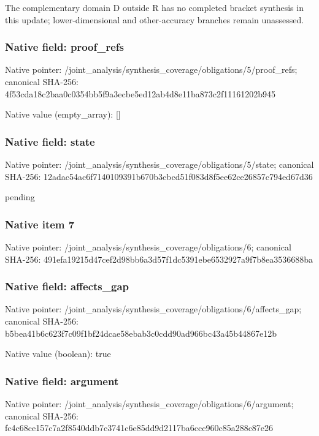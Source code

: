 \documentclass[10pt,a4paper]{article}
\begin{document}
\begingroup\raggedright\sloppy The complementary domain D outside R has no completed bracket synthesis in this update;\allowbreak{} lower-dimensional and other-accuracy branches remain unassessed.\par\endgroup

\subsubsection{Native field: proof\_\allowbreak{}refs}
Native pointer: /joint\_\allowbreak{}analysis/synthesis\_\allowbreak{}coverage/obligations/5/proof\_\allowbreak{}refs; canonical SHA-256: 4f53cda18c2baa0c0354bb5f9a3ecbe5ed12ab4d8e11ba873c2f11161202b945

Native value (empty\_\allowbreak{}array): []

\subsubsection{Native field: state}
Native pointer: /joint\_\allowbreak{}analysis/synthesis\_\allowbreak{}coverage/obligations/5/state; canonical SHA-256: 12adac54ac6f7140109391b670b3cbcd51f083d8f5ee62ce26857c794ed67d36

\begingroup\raggedright\sloppy pending\par\endgroup

\subsubsection{Native item 7}
Native pointer: /joint\_\allowbreak{}analysis/synthesis\_\allowbreak{}coverage/obligations/6; canonical SHA-256: 491efa19215d47cef2d98bb6a3d57f1dc5391ebe6532927a9f7b8ea3536688ba

\subsubsection{Native field: affects\_\allowbreak{}gap}
Native pointer: /joint\_\allowbreak{}analysis/synthesis\_\allowbreak{}coverage/obligations/6/affects\_\allowbreak{}gap; canonical SHA-256: b5bea41b6c623f7c09f1bf24dcae58ebab3c0cdd90ad966bc43a45b44867e12b

Native value (boolean): true

\subsubsection{Native field: argument}
Native pointer: /joint\_\allowbreak{}analysis/synthesis\_\allowbreak{}coverage/obligations/6/argument; canonical SHA-256: fc4c68ce157c7a2f8540ddb7c3741c6e85dd9d2117ba6ccc960c85a288c87e26
\end{document}
